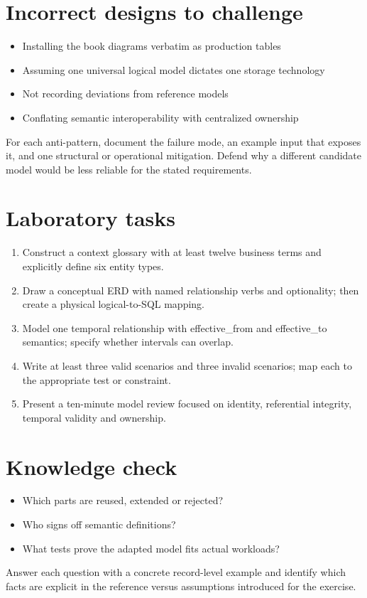 \documentclass[11pt,letterpaper]{article}
\begin{document}
\section{Incorrect designs to challenge}
\begin{itemize}
\item Installing the book diagrams verbatim as production tables
\item Assuming one universal logical model dictates one storage technology
\item Not recording deviations from reference models
\item Conflating semantic interoperability with centralized ownership
\end{itemize}
For each anti-pattern, document the failure mode, an example input that exposes it, and one structural or operational mitigation. Defend why a different candidate model would be less reliable for the stated requirements.


\section{Laboratory tasks}
\begin{enumerate}
\item Construct a context glossary with at least twelve business terms and explicitly define six entity types.
\item Draw a conceptual ERD with named relationship verbs and optionality; then create a physical logical-to-SQL mapping.
\item Model one temporal relationship with effective\_from and effective\_to semantics; specify whether intervals can overlap.
\item Write at least three valid scenarios and three invalid scenarios; map each to the appropriate test or constraint.
\item Present a ten-minute model review focused on identity, referential integrity, temporal validity and ownership.
\end{enumerate}

\section{Knowledge check}
\begin{itemize}
\item Which parts are reused, extended or rejected?
\item Who signs off semantic definitions?
\item What tests prove the adapted model fits actual workloads?
\end{itemize}
Answer each question with a concrete record-level example and identify which facts are explicit in the reference versus assumptions introduced for the exercise.
\end{document}
